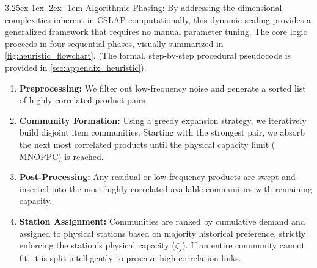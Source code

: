\documentclass[preprint,review,11pt,authoryear]{elsarticle}
\makeatletter
\renewcommand\paragraph{\@startsection{paragraph}{4}{\z@}
  {3.25ex \@plus1ex \@minus.2ex}
  {-1em}
  {\normalfont\normalsize\itshape}}
\makeatother
\begin{document}
\paragraph{Algorithmic Phasing:}
By addressing the dimensional complexities inherent in CSLAP computationally, this dynamic scaling provides a generalized framework that requires no manual parameter tuning. The core logic proceeds in four sequential phases, visually summarized in \cref{fig:heuristic_flowchart}. (The formal, step-by-step procedural pseudocode is provided in \ref{sec:appendix_heuristic}).

\begin{enumerate}
    \item \textbf{Preprocessing:} We filter out low-frequency noise and generate a sorted list of highly correlated product pairs %
    \item \textbf{Community Formation:} Using a greedy expansion strategy, we iteratively build disjoint item communities. Starting with the strongest pair, we absorb the next most correlated products until the physical capacity limit ($\mathrm{MNOPPC}$) is reached.
    \item \textbf{Post-Processing:} Any residual or low-frequency products are swept and inserted into the most highly correlated available communities with remaining capacity.
    \item \textbf{Station Assignment:} Communities are ranked by cumulative demand and assigned to physical stations based on majority historical preference, strictly enforcing the station's physical capacity ($\zeta_s$). If an entire community cannot fit, it is split intelligently to preserve high-correlation links.
\end{enumerate}

\vspace{0.5cm}
\end{document}
